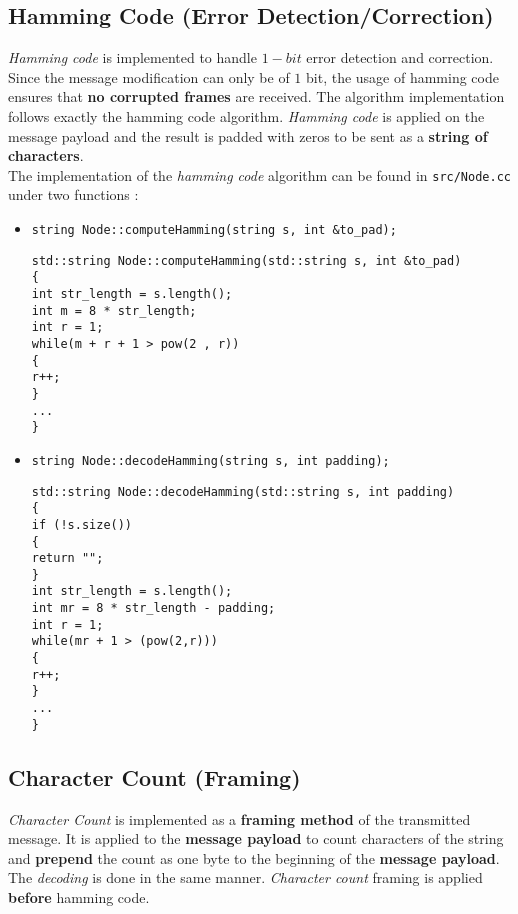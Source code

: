 \subsection{Hamming Code (Error Detection/Correction)}
\emph{Hamming code} is implemented to handle $1-bit$ error detection and correction. Since the message modification can only be of $1$ bit, the usage of hamming code ensures that \textbf{no corrupted frames} are received. The algorithm implementation follows exactly the hamming code algorithm. \emph{Hamming code} is applied on the message payload and the result is padded with zeros to be sent as a \textbf{string of characters}. \\

The implementation of the \emph{hamming code} algorithm can be found in \texttt{src/Node.cc} under two functions :
\begin{itemize}
    \item \texttt{string Node::computeHamming(string s, int \&to\_pad);}
    \begin{verbatim} 
std::string Node::computeHamming(std::string s, int &to_pad)
{
int str_length = s.length();
int m = 8 * str_length;
int r = 1;
while(m + r + 1 > pow(2 , r))
{
r++;
}
...
}
    \end{verbatim} 
    \item \texttt{string Node::decodeHamming(string s, int padding);}
    \begin{verbatim}
std::string Node::decodeHamming(std::string s, int padding)
{
if (!s.size())
{
return "";
}
int str_length = s.length();
int mr = 8 * str_length - padding;
int r = 1;
while(mr + 1 > (pow(2,r)))
{
r++;
}
...
}
    \end{verbatim}
\end{itemize}

\subsection{Character Count (Framing)}
\emph{Character Count} is implemented as a \textbf{framing method} of the transmitted message. It is applied to the \textbf{message payload} to count characters of the string and \textbf{prepend} the count as one byte to the beginning of the \textbf{message payload}. The \emph{decoding} is done in the same manner. \emph{Character count} framing is applied \textbf{before} hamming code. \\

